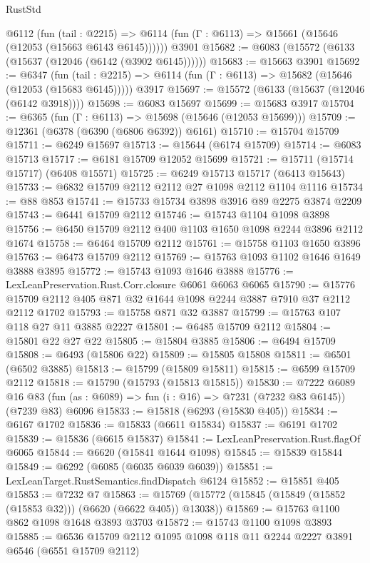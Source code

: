 \begin{lexlean}{RustStd}
\begin{coremodule}
    @6112
      (fun (tail : @2215) =>
      @6114 (fun (Γ : @6113) => @15661 (@15646 (@12053 (@15663 @6143 @6145))))))
    @3901
@15682 := @6083 (@15572 (@6133 (@15637 (@12046 (@6142 (@3902 @6145))))))
@15683 := @15663 @3901
@15692 := @6347
    (fun (tail : @2215) => @6114 (fun (Γ : @6113) => @15682 (@15646 (@12053 (@15683 @6145)))))
    @3917
@15697 := @15572 (@6133 (@15637 (@12046 (@6142 @3918))))
@15698 := @6083 @15697
@15699 := @15683 @3917
@15704 := @6365 (fun (Γ : @6113) => @15698 (@15646 (@12053 @15699)))
@15709 := @12361 (@6378 (@6390 (@6806 @6392)) @6161)
@15710 := @15704 @15709
@15711 := @6249 @15697
@15713 := @15644 (@6174 @15709)
@15714 := @6083 @15713
@15717 := @6181 @15709 @12052 @15699
@15721 := @15711 (@15714 @15717) (@6408 @15571)
@15725 := @6249 @15713 @15717 (@6413 @15643)
@15733 := @6832 @15709 @2112 @2112 @27 @1098 @2112 @1104 @1116
@15734 := @88 @853
@15741 := @15733 @15734 @3898 @3916 @89 @2275 @3874 @2209
@15743 := @6441 @15709 @2112
@15746 := @15743 @1104 @1098 @3898
@15756 := @6450 @15709 @2112 @400 @1103 @1650 @1098 @2244 @3896 @2112 @1674
@15758 := @6464 @15709 @2112
@15761 := @15758 @1103 @1650 @3896
@15763 := @6473 @15709 @2112
@15769 := @15763 @1093 @1102 @1646 @1649 @3888 @3895
@15772 := @15743 @1093 @1646 @3888
@15776 := LexLeanPreservation.Rust.Corr.closure @6061 @6063 @6065
@15790 := @15776 @15709 @2112 @405 @871 @32 @1644 @1098 @2244 @3887 @7910 @37 @2112 @2112 @1702
@15793 := @15758 @871 @32 @3887
@15799 := @15763 @107 @118 @27 @11 @3885 @2227
@15801 := @6485 @15709 @2112
@15804 := @15801 @22 @27 @22
@15805 := @15804 @3885
@15806 := @6494 @15709
@15808 := @6493 (@15806 @22)
@15809 := @15805 @15808
@15811 := @6501 (@6502 @3885)
@15813 := @15799 (@15809 @15811)
@15815 := @6599 @15709 @2112
@15818 := @15790 (@15793 (@15813 @15815))
@15830 := @7222
    @6089
    @16
    @83
    (fun (as : @6089) => fun (i : @16) => @7231 (@7232 @83 @6145))
    (@7239 @83)
    @6096
@15833 := @15818 (@6293 (@15830 @405))
@15834 := @6167 @1702
@15836 := @15833 (@6611 @15834)
@15837 := @6191 @1702
@15839 := @15836 (@6615 @15837)
@15841 := LexLeanPreservation.Rust.flagOf @6065
@15844 := @6620 (@15841 @1644 @1098)
@15845 := @15839 @15844
@15849 := @6292 (@6085 (@6035 @6039 @6039))
@15851 := LexLeanTarget.RustSemantics.findDispatch @6124
@15852 := @15851 @405
@15853 := @7232 @7
@15863 := @15769 (@15772 (@15845 (@15849 (@15852 (@15853 @32))) (@6620 (@6622 @405)) @13038))
@15869 := @15763 @1100 @862 @1098 @1648 @3893 @3703
@15872 := @15743 @1100 @1098 @3893
@15885 := @6536 @15709 @2112 @1095 @1098 @118 @11 @2244 @2227 @3891 @6546 (@6551 @15709 @2112)

\end{coremodule}
\end{lexlean}
